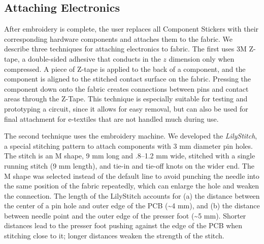 \documentclass{sigchi}
\begin{document}
\subsection{Attaching Electronics}




After embroidery is complete, the user replaces all Component Stickers with their corresponding hardware components and attaches them to the fabric.
We describe three techniques for attaching electronics to fabric. The first uses 3M Z-tape, a double-sided adhesive that conducts in the $z$ dimension only when compressed. A piece of Z-tape is applied to the back of a component, and the component is aligned to the stitched contact surface on the fabric. Pressing the component down onto the fabric creates connections between pins and contact areas through the Z-Tape. This technique is especially suitable for testing and prototyping a circuit, since it allows for easy removal, but can also be used for final attachment for e-textiles that are not handled much during use.




The second technique uses the embroidery machine. We developed the \textit{LilyStitch}, a special stitching pattern to attach components with 3 mm diameter pin holes. The stitch is an M shape, 9 mm long and .8--1.2 mm wide, stitched with a single running stitch (9 mm length), and tie-in and tie-off knots on the wider end. The M shape was selected instead of the default line to avoid punching the needle into the same position of the fabric repeatedly, which can enlarge the hole and weaken the connection. 
The length of the LilyStitch accounts for (a) the distance between the center of a pin hole and outer edge of the PCB (\textasciitilde 4 mm), and (b) the distance between needle point and the outer edge of the presser foot (\textasciitilde 5 mm). Shorter distances lead to the presser foot pushing against the edge of the PCB when stitching close to it; longer distances weaken the strength of the stitch.
\end{document}
